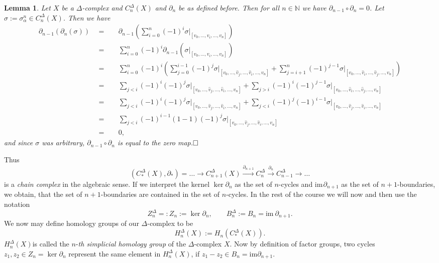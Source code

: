 \documentclass[11pt]{book}
\numberwithin{dummy}{section}
\newtheorem{lemma}[theorem]{Lemma}
\theoremstyle{nonumberbreak}
\newenvironment{pr}[1][]{\ifthenelse{\equal{#1}{}}{\proof}{\proof[#1]}\rm}{\endproof}
\newcommand{\la}{\longrightarrow}
\begin{document}
\begin{spacing}{1.4}
\begin{lemma}
Let $X$ be a $\Delta$-complex and $C_n^{\Delta}(X)$ and $\partial_n$ be as defined before. Then for all $n \in \mathbb{N}$ we have $\partial_{n-1} \circ \partial_n = 0$.
\begin{pr}
Let $\sigma := \sigma_{\alpha}^n \in C_n^{\Delta}(X)$. Then we have
\setlength{\abovedisplayskip}{5.5pt}
\setlength{\belowdisplayskip}{5.5pt}
\begin{alignat*}{5}
\partial_{n-1}\left(\partial_n(\sigma)\right) \ \ &=&& \ \ \partial_{n-1} \left( \sum_{i=0}^n (-1)^{i} \sigma \vert_{[v_0, \ldots, \hat{v}_i, \ldots, v_n]} \right) \\
&=&& \ \ \sum_{i=0}^n (-1)^{i} \partial_{n-1}\left( \sigma \vert_{[v_0, \ldots, \hat{v}_i, \ldots, v_n]} \right) \\
&=&& \ \ \sum_{i=0}^n (-1)^{i} \left( \sum_{j=0}^{i-1} (-1)^{j} \sigma \vert_{[v_0, \ldots, \hat{v}_j, \ldots, \hat{v}_i, \ldots, v_n]} + \sum_{j=i+1}^{n} (-1)^{j-1} \sigma \vert_{[v_0, \ldots, \hat{v}_i, \ldots, \hat{v}_j, \ldots, v_n]} \right) \\
&=&& \ \ \sum_{j<i} (-1)^{i} (-1)^{j} \sigma\vert_{[v_0, \ldots, \hat{v}_j, \ldots, \hat{v}_i, \dots, v_n]}  + \sum_{j>i} (-1)^{i} (-1)^{j-1} \sigma \vert_{[v_0, \ldots, \hat{v}_i, \ldots, \hat{v}_j, \ldots, v_n]} \\
&=&& \ \ \sum_{j<i} (-1)^{i} (-1)^{j} \sigma\vert_{[v_0, \ldots, \hat{v}_j, \ldots, \hat{v}_i, \dots, v_n]}  + \sum_{j<i} (-1)^{j} (-1)^{i-1} \sigma \vert_{[v_0, \ldots, \hat{v}_j, \ldots, \hat{v}_i, \ldots, v_n]} \\
&=&& \ \ \sum_{j<i} (-1)^{i-1} (1-1) (-1)^{j} \sigma\vert_{[v_0, \ldots, \hat{v}_j, \ldots, \hat{v}_i, \dots, v_n]}\\
&=&& \ \ 0,
\end{alignat*}
and since $\sigma$ was arbitrary, $\partial_{n-1} \circ \partial_n$ is equal to the zero map.$\hfill \Box$

\end{pr}

\end{lemma}


Thus
$$(C_*^{\Delta}(X), \partial_{*}) = \ldots \la C_{n+1}^{\Delta}(X) \overset{\partial_{n+1}}{\la} C_n^{\Delta} \overset{\partial_n}{\la} C_{n-1}^{\Delta} \la \ldots $$
is a \textit{chain complex} in the algebraic sense. If we interpret the kernel $\ker \partial_n$ as the set of $n$-cycles and $\mathrm{im} \hspace{1pt} \partial_{n+1}$ as the set of $n+1$-boundaries, we obtain, that the set of $n+1$-boundaries are contained in the set of $n$-cycles. In the rest of the course we will now and then use the notation
$$Z_n^{\Delta} =: Z_n := \ker \partial_n, \qquad B_n^{\Delta}:= B_n = \mathrm{im} \ \partial_{n+1}.$$
We now may define homology groups of our $\Delta$-complex to be
$$H_n^{\Delta}(X) := H_n(C_*^{\Delta}(X)).$$
$H_n^{\Delta}(X)$is called the $n$-\textit{th simplicial homology group} of the $\Delta$-complex $X$.
Now by definition of factor groups, two cycles $z_1, z_2 \in Z_n = \ker \partial_n$ represent the same element in $H_n^{\Delta}(X)$, if $z_1 - z_2 \in B_{n} =\mathrm{im} \partial_{n+1}$.




\end{spacing}
\end{document}
